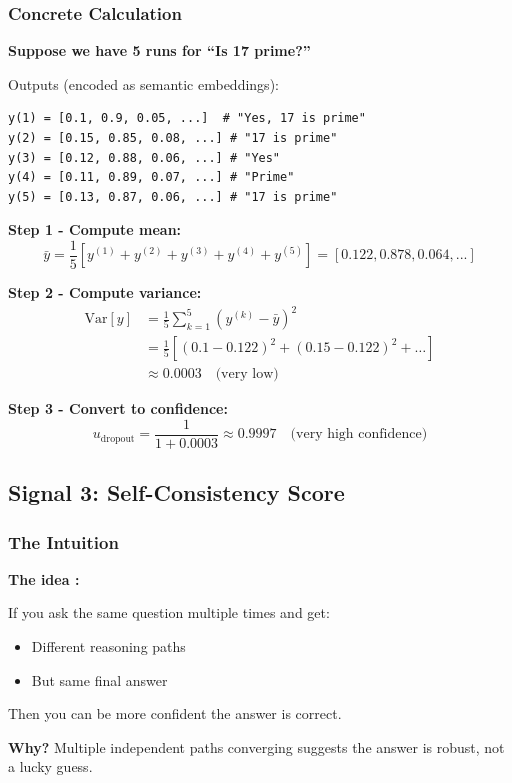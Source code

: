 \documentclass[12pt,a4paper]{article}
\theoremstyle{definition}
\begin{document}
\subsubsection{Concrete Calculation}

\begin{examplebox}
\textbf{Suppose we have 5 runs for ``Is 17 prime?''}

Outputs (encoded as semantic embeddings):
\begin{verbatim}
y(1) = [0.1, 0.9, 0.05, ...]  # "Yes, 17 is prime"
y(2) = [0.15, 0.85, 0.08, ...] # "17 is prime"
y(3) = [0.12, 0.88, 0.06, ...] # "Yes"
y(4) = [0.11, 0.89, 0.07, ...] # "Prime"
y(5) = [0.13, 0.87, 0.06, ...] # "17 is prime"
\end{verbatim}

\textbf{Step 1 - Compute mean:}
\begin{equation}
\bar{y} = \frac{1}{5}[y^{(1)} + y^{(2)} + y^{(3)} + y^{(4)} + y^{(5)}] = [0.122, 0.878, 0.064, ...]
\end{equation}

\textbf{Step 2 - Compute variance:}
\begin{align}
\text{Var}[y] &= \frac{1}{5}\sum_{k=1}^5 (y^{(k)} - \bar{y})^2 \\
&= \frac{1}{5}[(0.1-0.122)^2 + (0.15-0.122)^2 + \ldots ] \\
&\approx 0.0003 \quad \text{(very low)}
\end{align}

\textbf{Step 3 - Convert to confidence:}
\begin{equation}
u_{\text{dropout}} = \frac{1}{1 + 0.0003} \approx 0.9997 \quad \text{(very high confidence)}
\end{equation}
\end{examplebox}

\subsection{Signal 3: Self-Consistency Score}

\subsubsection{The Intuition}

\begin{intuitionbox}
\textbf{The idea \cite{wang2023selfconsistency}:}

If you ask the same question multiple times and get:
\begin{itemize}
    \item Different reasoning paths
    \item But same final answer
\end{itemize}

Then you can be more confident the answer is correct.

\textbf{Why?} Multiple independent paths converging suggests the answer is robust, not a lucky guess.
\end{intuitionbox}
\end{document}
